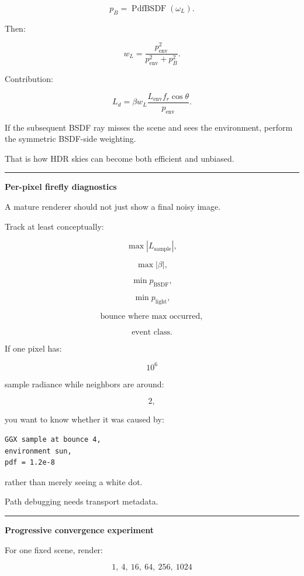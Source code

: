 \[
p_B=
\operatorname{PdfBSDF}(\omega_L).
\]

Then:

\[
w_L
=
\frac{
p_{\text{env}}^2
}{
p_{\text{env}}^2+p_B^2
}.
\]

Contribution:

\[
\boxed{
L_d
=
\beta
w_L
\frac{
L_{\text{env}}
f_r
\cos\theta
}{
p_{\text{env}}
}.
}
\]

If the subsequent BSDF ray misses the scene and sees the environment, perform the symmetric BSDF-side weighting.

That is how HDR skies can become both efficient and unbiased.

\begin{center}\rule{0.5\linewidth}{0.5pt}\end{center}

\textbf{Per-pixel firefly diagnostics}

A mature renderer should not just show a final noisy image.

Track at least conceptually:

\[
\max |L_{\text{sample}}|,
\]

\[
\max |\beta|,
\]

\[
\min p_{\text{BSDF}},
\]

\[
\min p_{\text{light}},
\]

\[
\text{bounce where max occurred},
\]

\[
\text{event class}.
\]

If one pixel has:

\[
10^6
\]

sample radiance while neighbors are around:

\[
2,
\]

you want to know whether it was caused by:

\begin{verbatim}
GGX sample at bounce 4,
environment sun,
pdf = 1.2e-8
\end{verbatim}

rather than merely seeing a white dot.

Path debugging needs transport metadata.

\begin{center}\rule{0.5\linewidth}{0.5pt}\end{center}

\textbf{Progressive convergence experiment}

For one fixed scene, render:

\[
1,\ 4,\ 16,\ 64,\ 256,\ 1024
\]

